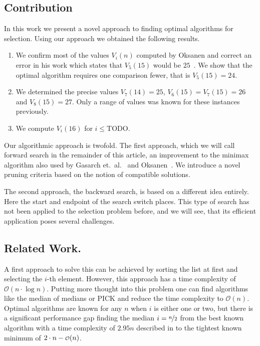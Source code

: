 \documentclass[twoside,leqno,twocolumn]{article}
\newcommand\smallO{
\mathchoice
{{\scriptstyle\mathcal{O}}}%
{{\scriptstyle\mathcal{O}}}%
{{\scriptscriptstyle\mathcal{O}}}%
{\scalebox{.50}{$\scriptscriptstyle\mathcal{O}$}}%
}
\begin{document}
\subsection{Contribution}
In this work we present a novel approach to finding optimal algorithms for selection.
Using our approach we obtained the following results.
\begin{enumerate}
  \item We confirm most of the values $V_i(n)$ computed by Oksanen and correct an error in his work which states that $V_5(15)$ would be $25$~\cite{Oksanen}.
        We show that the optimal algorithm requires one comparison fewer, that is $V_5(15) = 24$.
  \item We determined the precise values $V_7(14) = 25$, $V_6(15) = V_7(15) = 26$ and $V_8(15) = 27$.
        Only a range of values was known for these instances previously.
  \item We compute $V_i(16)$ for $i \le \text{TODO}$.
\end{enumerate}

Our algorithmic approach is twofold.
The first approach, which we will call forward search in the remainder of this article, an improvement to the minimax algorithm also used by Gasarch et.\ al\@.~\cite{Gasarch1996} and Oksanen~\cite{Oksanen,Oksanen2006}.
We introduce a novel pruning criteria based on the notion of compatible solutions.

The second approach, the backward search, is based on a different idea entirely.
Here the start and endpoint of the search switch places.
This type of search has not been applied to the selection problem before, and we will see, that its efficient application poses several challenges.



\subsection{Related Work.}
A first approach to solve this can be achieved by sorting the list at first and selecting the $i$-th
element.
However, this approach has a time complexity of $\mathcal{O}(n \cdot \log n)$.
Putting more thought into this problem one can find algorithms like the median of medians \cite{Schoening1993} or PICK \cite{Blum1972} and reduce the time complexity to $\mathcal{O}(n)$.
Optimal algorithms are known for any $n$ when $i$ is either one or two, but there is a significant performance gap finding the median $i = \nicefrac{n}{2}$ from the best known algorithm with a time complexity of $2.95n$ described in \cite{dor1999selecting} to the tightest known minimum of $2 \cdot n - \smallO(n)$.
\end{document}
